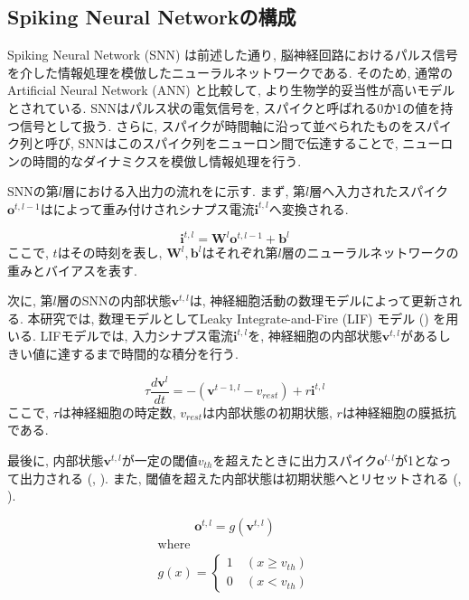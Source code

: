 \subsection{Spiking Neural Networkの構成}

Spiking Neural Network (SNN) は前述した通り, 脳神経回路におけるパルス信号を介した情報処理を模倣したニューラルネットワークである\cite{generalsnn}.
そのため, 通常のArtificial Neural Network (ANN) と比較して, より生物学的妥当性が高いモデルとされている.
SNNはパルス状の電気信号を, スパイクと呼ばれる0か1の値を持つ信号として扱う.
さらに, スパイクが時間軸に沿って並べられたものをスパイク列と呼び, SNNはこのスパイク列をニューロン間で伝達することで, ニューロンの時間的なダイナミクスを模倣し情報処理を行う.

SNNの第$l$層における入出力の流れをに示す.
まず, 第$l$層へ入力されたスパイク$\bm{o}^{t, l-1}$はによって重み付けされシナプス電流$\bm{i}^{t,l}$へ変換される.

\begin{equation}
    \bm{i}^{t, l} = \bm{W}^l\bm{o}^{t, l-1} + \bm{b}^l
    \label{eq:input_spike}
\end{equation}
ここで, $t$はその時刻を表し, $\bm{W}^l, \bm{b}^l$はそれぞれ第$l$層のニューラルネットワークの重みとバイアスを表す.

次に, 第$l$層のSNNの内部状態$\bm{v}^{t, l}$は, 神経細胞活動の数理モデルによって更新される.
本研究では, 数理モデルとしてLeaky Integrate-and-Fire (LIF) モデル () を用いる.
LIFモデルでは, 入力シナプス電流$\bm{i}^{t, l}$を, 神経細胞の内部状態$\bm{v}^{t, l}$があるしきい値に達するまで時間的な積分を行う.

\begin{equation}
    {\tau}\frac{d\bm{v}^l}{dt}=-\left(\bm{v}^{t-1,l}-v_{rest}\right)+r\bm{i}^{t, l}
    \label{eq:lif}
\end{equation}
ここで, $\tau$は神経細胞の時定数, $v_{rest}$は内部状態の初期状態, $r$は神経細胞の膜抵抗である.

最後に, 内部状態$\bm{v}^{t, l}$が一定の閾値$v_{th}$を超えたときに出力スパイク$\bm{o}^{t, l}$が1となって出力される (, ).
また, 閾値を超えた内部状態は初期状態へとリセットされる (, ).

\begin{equation}
  \bm{o}^{t, l}=g\left(\bm{v}^{t, l}\right) \label{eq:outputSpike1:1}
\end{equation}
\begin{equation}
  \begin{split}
    \text{where} \hspace{3cm}\ \\
    g\left(x\right)=\left\{
      \begin{alignedat}{2}
        1 &\:\left(x{\geq}v_{th}\right)\\
        0 &\:\left(x{<}v_{th}\right)
      \end{alignedat}
    \right. \label{eq:outputSpike1:2}
  \end{split}
\end{equation}

